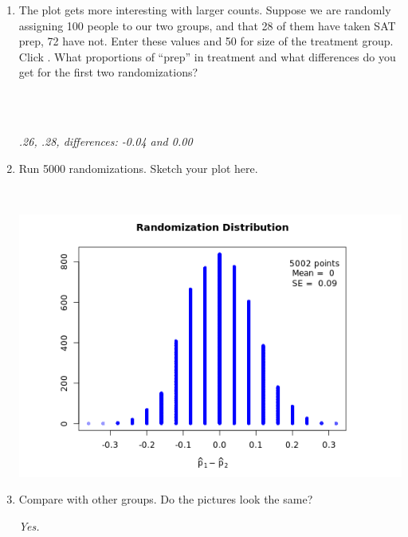 \begin{enumerate}
\begin{enumerate}
\item The plot gets more interesting with larger counts. Suppose 
      we are randomly assigning 100 people to our two groups, and that
      28 of them have taken SAT prep, 72 have not. Enter these values
      and 50 for size of the treatment group. Click . 
      What proportions of ``prep'' in treatment and what differences
      do you get for the first two randomizations? 
\begin{students}
        \vspace{1cm}\\
\end{students}
\begin{key}
  \\ {\it .26, .28, differences: -0.04 and 0.00}
\end{key}
       \item Run 5000 randomizations.  Sketch your plot here.
\begin{students}
        \vspace{4cm}\\
\end{students}
\begin{key}
  
   \includegraphics[width=.4\linewidth]{plots/SATprep-shuffles.png}
\end{key}
     \item Compare with other groups.  Do the pictures look the
       same?
\begin{key}
  {\it  Yes. }
\end{key}



\end{enumerate}
\end{enumerate}

